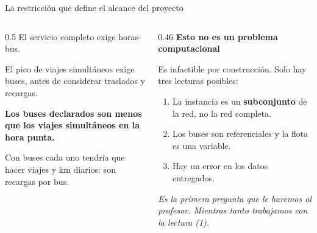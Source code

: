 \documentclass[aspectratio=169,11pt]{beamer}
\begin{document}
\begin{frame}{La restricción que define el alcance del proyecto}
  \small
  \begin{columns}[t]
    \begin{column}{0.5\textwidth}
      El servicio completo exige \horasBus{} horas-bus.

      \vspace{4pt}
      El pico de viajes simultáneos exige \picoSimultaneo{} buses,
      antes de considerar traslados y recargas.

      \vspace{8pt}
      {\color{critred}\bfseries Los \flotaDeclarada{} buses declarados
      son menos que los viajes simultáneos en la hora punta.}

      \vspace{8pt}
      Con \flotaDeclarada{} buses cada uno tendría que hacer
      \viajesPorBusDecl{} viajes y \kmPorBusDecl{} km diarios: son
      \recargasPorBusDecl{} recargas por bus.
    \end{column}
    \begin{column}{0.46\textwidth}
      {\color{ink}\bfseries Esto no es un problema computacional}

      \vspace{4pt}
      Es infactible por construcción. Solo hay tres lecturas posibles:

      \begin{enumerate}\footnotesize
        \item La instancia es un \textbf{subconjunto} de la red, no la red completa.
        \item Los \flotaDeclarada{} buses son referenciales y la flota es una variable.
        \item Hay un error en los datos entregados.
      \end{enumerate}

      \vspace{6pt}
      \textit{Es la primera pregunta que le haremos al profesor. Mientras tanto
      trabajamos con la lectura (1).}
    \end{column}
  \end{columns}
\end{frame}
\end{document}
